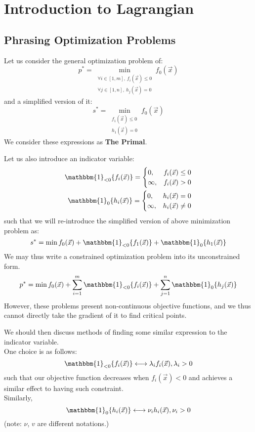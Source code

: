 \section{Introduction to Lagrangian}

\subsection{Phrasing Optimization Problems}
Let us consider the general optimization problem of:
\[
    p^* = \min_{\substack{
        \forall i \in [1, m],\ f_i(\vec{x}) \leq 0 \\
        \forall j \in [1, n],\ h_j(\vec{x}) = 0
    }} f_0 (\vec{x})
\]
and a simplified version of it:
\[
    s^* = \min_{\substack{
        f_1(\vec{x}) \leq 0 \\
        h_1(\vec{x}) = 0
    }} f_0 (\vec{x})
\]
We consider these expressions as \textbf{The Primal}.

Let us also introduce an indicator variable:
\begin{align*}
    \mathbbm{1}_{<0} \{f_i(\vec{x})\} =
    \begin{cases}
        0, &f_i(\vec{x}) \leq 0 \\
        \infty, &f_i(\vec{x}) > 0
    \end{cases} \\
    \mathbbm{1}_{0} \{h_i(\vec{x})\} =
    \begin{cases}
        0, &h_i(\vec{x}) = 0 \\
        \infty, &h_i(\vec{x}) \neq 0
    \end{cases}
\end{align*}
such that we will re-introduce the simplified version of above minimization problem as:
\[
    s^* = \min f_0 (\vec{x}) + \mathbbm{1}_{<0} \{f_1(\vec{x})\} + \mathbbm{1}_{0} \{h_1(\vec{x})\}
\]
We may thus write a constrained optimization problem into its unconstrained form. \\
\[
    p^* = \min f_0 (\vec{x}) + \sum_{i = 1}^m \mathbbm{1}_{<0} \{f_i(\vec{x})\} + \sum_{j = 1}^n \mathbbm{1}_{0} \{h_j(\vec{x})\}
\]
However, these problems present non-continuous objective functions, and we thus cannot directly take the gradient of it to find critical points.

We should then discuss methods of finding some similar expression to the indicator variable. \\
One choice is as follows:
\[
    \mathbbm{1}_{<0} \{f_i(\vec{x})\} \longleftrightarrow \lambda_i f_i (\vec{x}), \lambda_i > 0
\]
such that our objective function decreases when $f_i(\vec{x}) < 0$ and achieves a similar effect to having such constraint. \\
Similarly, 
\[
    \mathbbm{1}_{0} \{h_i(\vec{x})\} \longleftrightarrow \nu_i h_i (\vec{x}), \nu_i > 0
\]
(note: $\nu$, $v$ are different notations.)

